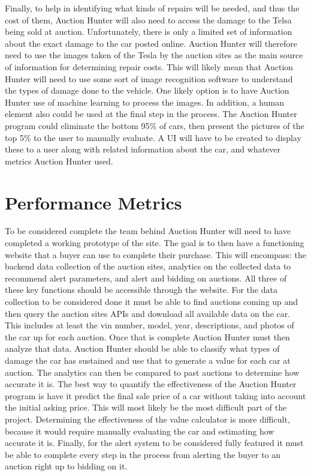 \documentclass[draftclsnofoot,onecolumn,10pt]{IEEEtran}
\begin{document}
\vspace{3mm}Finally, to help in identifying what kinds of repairs will be needed, and thus the cost of them, Auction Hunter will also need to access the damage to the Telsa being sold at auction. Unfortunately, there is only a limited set of information about the exact damage to the car posted online. Auction Hunter will therefore need to use the images taken of the Tesla by the auction sites as the main source of information for determining repair costs. This will likely mean that Auction Hunter will need to use some sort of image recognition software to understand the types of damage done to the vehicle. One likely option is to have Auction Hunter use of machine learning to process the images. In addition, a human element also could be used at the final step in the process. The Auction Hunter program could eliminate the bottom 95\% of cars, then present the pictures of the top 5\% to the user to manually evaluate. A UI will have to be created to display these to a user along with related information about the car, and whatever metrics Auction Hunter used. 

\newpage

\section{Performance Metrics}
To be considered complete the team behind Auction Hunter will need to have completed a working prototype
of the site. The goal is to then have a functioning website that a buyer can use to complete their purchase. This will encompass: the backend data collection of the auction sites, analytics on the collected data to recommend alert parameters, and alert and bidding on auctions. All three of these key functions should be accessible through the website. For the data collection to be considered done it must be able to find auctions coming up and then query the auction sites APIs and download all available data on the car. This includes at least the vin number, model, year, descriptions, and photos of the car up for each auction. Once that is complete Auction Hunter must then analyze that data. Auction Hunter should be able to classify what types of damage the car has sustained and use that to generate a value for each car at auction. The analytics can then be compared to past auctions to determine how accurate it is. The best way to quantify the effectiveness of the Auction Hunter program is have it predict the final sale price of a car without taking into account the initial asking price. This will most likely be the most difficult part of the project. Determining the effectiveness of the value calculator is more difficult, because it would require manually evaluating the car and estimating how accurate it is. Finally, for the alert system to be considered fully featured it must be able to complete every step in the process from alerting the buyer to an auction right up to bidding on it.
\end{document}
